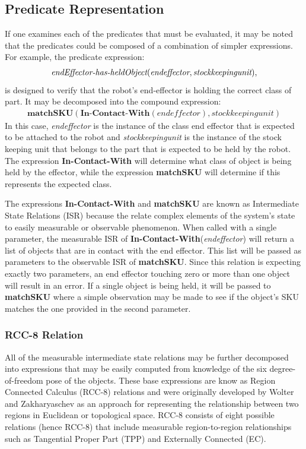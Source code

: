 \subsection{Predicate Representation}
If one examines each of the predicates that must be evaluated, it may be
noted that the predicates could be composed of a combination of simpler 
expressions. For example, the predicate expression:
\begin{gather} 
\textit{endEffector-has-heldObject}(\textit{endeffector}, 
\textit{stockkeepingunit}),
\label{equation:endEffector-has-heldObject}
\end{gather}
is designed to verify that the robot's end-effector is holding the correct class of part. It may be decomposed into the compound expression: 
\begin{gather}
\textbf{matchSKU}(\textbf{In-Contact-With}(\textit{endeffector}), stockkeepingunit)
\label{equation:matchSKU}
\end{gather}
In this case, \textit{endeffector} is the instance of the class end effector
that is expected to be attached to the robot
and 
\textit{stockkeepingunit} is the instance of the stock keeping unit
that belongs to the part that is expected to be held by the robot.
The expression \textbf{In-Contact-With} will determine what class of object is being held by the effector, while the expression \textbf{matchSKU} will determine if this represents the expected class.
 
The expressions \textbf{In-Contact-With} and \textbf{matchSKU}
are known as Intermediate State Relations (ISR) because the relate
complex elements of the system's state to easily measurable or
observable phenomenon. When called with a single parameter,
the measurable ISR of 
\textbf{In-Contact-With}(\textit{endeffector}) will return
a list of objects that are in contact with the end effector. 
This list will be passed as parameters to the observable
ISR of \textbf{matchSKU}. Since this relation is
expecting exactly two parameters, an end effector touching
zero or more than one object will result in an error. If a
single object is being held, it will be passed to \textbf{matchSKU} where
a simple observation may be made to see if the object's SKU
matches the one provided in the second parameter.

\subsubsection{RCC-8 Relation}
All of the measurable intermediate state relations may be further
decomposed into expressions that may be easily computed from
knowledge of the six degree-of-freedom pose of the objects. 
These base expressions are know
as Region Connected Calculus (RCC-8) relations and were originally
developed by Wolter and Zakharyaschev \cite{Wolter2000} 
as an approach for representing the relationship between two regions in 
Euclidean or topological space. 
RCC-8 consists of eight possible relations (hence RCC-8) that include
measurable region-to-region relationships such as
Tangential Proper Part (TPP) and Externally Connected (EC). 

